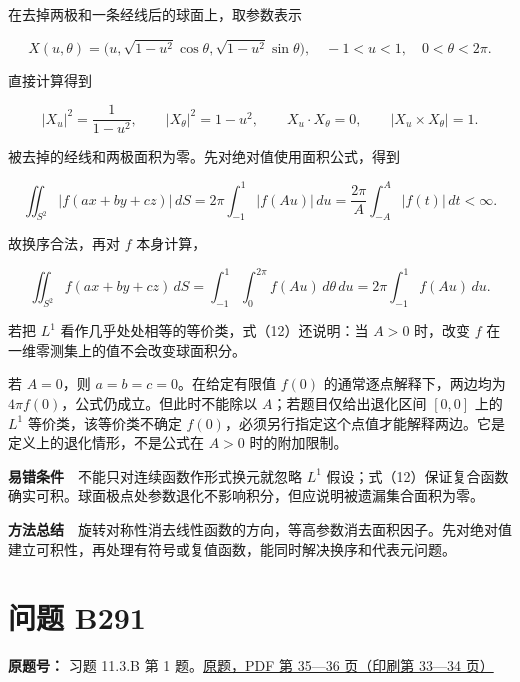\documentclass[11pt,a4paper]{article}
\begin{document}
在去掉两极和一条经线后的球面上，取参数表示

\begin{equation}
X(u,\theta)=\big(u,\sqrt{1-u^2}\cos\theta,
\sqrt{1-u^2}\sin\theta\big),
\quad -1<u<1,\quad0<\theta<2\pi.
\tag{10}
\end{equation}

直接计算得到

\begin{equation}
|X_u|^2=\frac1{1-u^2},\qquad
|X_\theta|^2=1-u^2,\qquad
X_u\cdot X_\theta=0,\qquad
|X_u\times X_\theta|=1.
\tag{11}
\end{equation}

被去掉的经线和两极面积为零。先对绝对值使用面积公式，得到

\begin{equation}
\iint_{S^2}|f(ax+by+cz)|\,dS
=2\pi\int_{-1}^1|f(Au)|\,du
=\frac{2\pi}{A}\int_{-A}^A|f(t)|\,dt<\infty.
\tag{12}
\end{equation}

故换序合法，再对 \(f\) 本身计算，

\begin{equation}
\iint_{S^2}f(ax+by+cz)\,dS
=\int_{-1}^1\int_0^{2\pi}f(Au)\,d\theta\,du
=2\pi\int_{-1}^1f(Au)\,du.
\tag{13}
\end{equation}

若把 \(L^1\) 看作几乎处处相等的等价类，式（12）还说明：当 \(A>0\)
时，改变 \(f\) 在一维零测集上的值不会改变球面积分。

若 \(A=0\)，则 \(a=b=c=0\)。在给定有限值 \(f(0)\)
的通常逐点解释下，两边均为 \(4\pi f(0)\)，公式仍成立。但此时不能除以
\(A\)；若题目仅给出退化区间 \([0,0]\) 上的 \(L^1\)
等价类，该等价类不确定
\(f(0)\)，必须另行指定这个点值才能解释两边。它是定义上的退化情形，不是公式在
\(A>0\) 时的附加限制。

\textbf{易错条件}　不能只对连续函数作形式换元就忽略 \(L^1\)
假设；式（12）保证复合函数确实可积。球面极点处参数退化不影响积分，但应说明被遗漏集合面积为零。

\textbf{方法总结}　旋转对称性消去线性函数的方向，等高参数消去面积因子。先对绝对值建立可积性，再处理有符号或复值函数，能同时解决换序和代表元问题。

\section{问题 B291}\label{ux95eeux9898-b291}

\textbf{原题号：} 习题 11.3.B 第 1
题。\href{https://zj139.github.io/math-notes/files/problems/楼分析习题-v2.pdf\#page=35}{原题，PDF
第 35---36 页（印刷第 33---34 页）}
\end{document}
